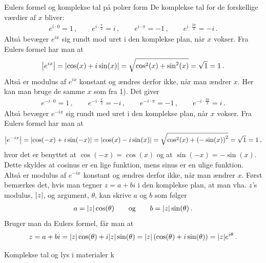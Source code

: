 \begin{opgave}[3]{Eulers formel og komplekse tal på polær form}
\opg De komplekse tal for de forskellige værdier af $x$ bliver:
\begin{align*}
e^{i \cdot 0} = 1 \, , \qquad e^{i \cdot \frac{\pi}{2}} = i \, , \qquad e^{i \cdot \pi} = -1 \, , \qquad e^{i \cdot \frac{3\pi}{2}} = -i \, .
\end{align*}
Altså bevæger $e^{ix}$ sig rundt mod uret i den komplekse plan, når $x$ vokser.
\opg Fra Eulers formel har man at
\begin{align*}
\abs{e^{ix}} = \abs{\cos(x) + i \sin(x)} = \sqrt{\cos^2(x) + \sin^2(x)} = \sqrt{1} = 1 \, .
\end{align*}
Altså  er modulus af $e^{ix}$ konstant og ændres derfor ikke, når man ændrer $x$.
\opg Her kan man bruge de samme $x$ som fra 1). Det giver
\begin{align*}
e^{-i \cdot 0} = 1 \, , \qquad e^{-i \cdot \frac{\pi}{2}} = -i \, , \qquad e^{-i \cdot \pi} = -1 \, , \qquad e^{-i \cdot \frac{3\pi}{2}} = i \, .
\end{align*}
Altså bevæger $e^{-ix}$ sig rundt med uret i den komplekse plan, når $x$ vokser.
\opg Fra Eulers formel har man at
\begin{align*}
\abs{e^{-ix}} = \abs{\cos(-x) + i \sin(-x)} = \abs{\cos(x) - i \sin(x)} = \sqrt{\cos^2(x) + \left(-\sin(x)\right)^2} = \sqrt{1} = 1 \, ,
\end{align*}
hvor det er benyttet at $\cos(-x) = \cos(x)$ og at $\sin(-x) = -\sin(x)$. Dette skyldes at cosinus er en lige funktion, mens sinus er en ulige funktion. Altså  er modulus af $e^{-ix}$ konstant og ændres derfor ikke, når man ændrer $x$.
\opg Først bemærkes det, hvis man tegner $z=a+bi$ i den komplekse plan, at man vha. $z$'s modulus, $\abs{z}$, og argument, $\theta$, kan skrive $a$ og $b$ som følger
\begin{align*}
a = \abs{z} \cos(\theta)  \qquad \text{og} \qquad b = \abs{z}\sin(\theta) \, .
\end{align*}
Bruger man da Eulers formel, får man at
\begin{align*}
z = a+bi = \abs{z}\cos(\theta)+i\abs{z}\sin(\theta) = \abs{z}\left(\cos(\theta)+i\sin(\theta)\right) = \abs{z}e^{i\theta} \, .
\end{align*}
\end{opgave}
\begin{opgave}[3]{Komplekse tal og lys i materialer}
k
\end{opgave}